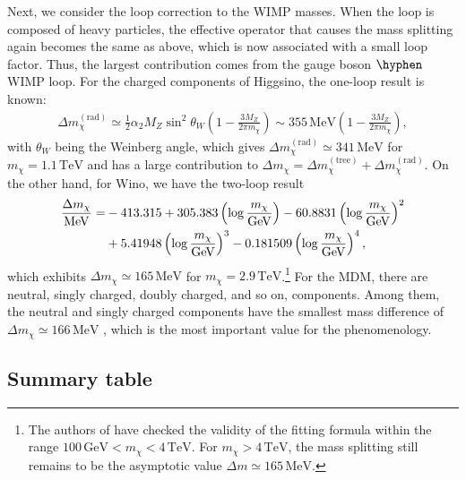 \documentclass[12pt,twoside,book]{article}
\begin{document}
Next, we consider the loop correction to the WIMP masses.
When the loop is composed of heavy particles, the effective operator that causes the mass splitting again becomes the same as above, which is now associated with a small loop factor.
Thus, the largest contribution comes from the gauge boson $\hyphen$ WIMP loop.
For the charged components of Higgsino, the one-loop result is known: \cite{Fukuda:2017jmk}
\begin{align}
  \Delta m_\chi^{\mathrm{(rad)}} \simeq \frac{1}{2} \alpha_2 M_Z \sin^2 \theta_W
  \left( 1 - \frac{3 M_Z}{2\pi m_\chi} \right)
  \sim 355\,\mathrm{MeV} \left( 1 - \frac{3 M_Z}{2\pi m_\chi} \right),
  \label{eq:Higgsino_delm_rad}
\end{align}
with $\theta_W$ being the Weinberg angle, which gives $\Delta m_\chi^{\mathrm{(rad)}} \simeq 341\,\mathrm{MeV}$ for $m_\chi = 1.1\,\mathrm{TeV}$ and has a large contribution to $\Delta m_\chi = \Delta m_\chi^{\mathrm{(tree)}} + \Delta m_\chi^{\mathrm{(rad)}}$.
On the other hand, for Wino, we have the two-loop result \cite{Ibe:2012sx}
\newcommand{\logmchi}{\left( \log \frac{m_\chi}{\mathrm{GeV}} \right)}
\begin{align}
  \frac{\Delta m_\chi}{\mathrm{MeV}} =
  &-413.315 + 305.383 \logmchi - 60.8831 \logmchi^2 \notag \\
  &+ 5.41948 \logmchi^3 - 0.181509 \logmchi^4,
\end{align}
which exhibits $\Delta m_\chi \simeq 165\,\mathrm{MeV}$ for $m_\chi = 2.9\,\mathrm{TeV}$.\footnote{
  The authors of \cite{Ibe:2012sx} have checked the validity of the fitting formula within the range $100\, \mathrm{GeV} < m_\chi < 4\,\mathrm{TeV}$.
  For $m_\chi > 4\,\mathrm{TeV}$, the mass splitting still remains to be the asymptotic value $\Delta m \simeq 165\,\mathrm{MeV}$.
}
For the MDM, there are neutral, singly charged, doubly charged, and so on, components.
Among them, the neutral and singly charged components have the smallest mass difference of $\Delta m_\chi \simeq 166\, \mathrm{MeV}$ \cite{Cirelli:2005uq}, which is the most important value for the phenomenology.


\subsection{Summary table}
\label{sec:model_summary}
\end{document}
